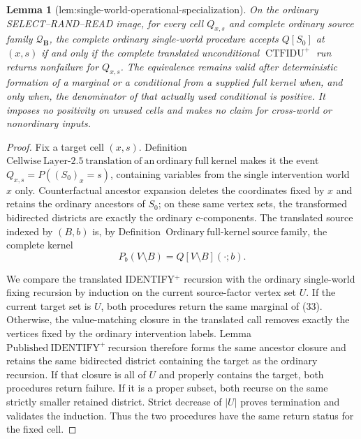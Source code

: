 \documentclass{article}
\newtheorem{lemma}{Lemma}
\begin{document}
\begin{lemma}[lem:single-world-operational-specialization]\label{lem:single-world-operational-specialization}
On the ordinary SELECT--RAND--READ image, for every cell \(Q_{x,s}\) and complete ordinary source family \(\mathcal Q_{\mathbf B}\), the complete ordinary single-world procedure accepts \(Q[S_0]\) at \((x,s)\) if and only if the complete translated unconditional \(\operatorname{CTFIDU}^{+}\) run returns nonfailure for \(Q_{x,s}\).  The equivalence remains valid after deterministic formation of a marginal or a conditional from a supplied full kernel when, and only when, the denominator of that actually used conditional is positive.  It imposes no positivity on unused cells and makes no claim for cross-world or nonordinary inputs.
\end{lemma}
\begin{proof}
Fix a target cell \((x,s)\).  Definition~\(\mathrm{Cellwise\ Layer\mbox{-}2.5\ translation\ of\ an\ ordinary\ full\ kernel}\) makes it the event
\(Q_{x,s}=P((S_0)_x=s)\), containing variables from the single intervention world \(x\) only.  Counterfactual ancestor expansion deletes the coordinates fixed by \(x\) and retains the ordinary ancestors of \(S_0\); on these same vertex sets, the transformed bidirected districts are exactly the ordinary c-components.  The translated source indexed by \((B,b)\) is, by Definition~\(\mathrm{Ordinary\ full\mbox{-}kernel\ source\ family}\), the complete kernel
\[
 P_b(V\setminus B)=Q[V\setminus B](\cdot;b).
 \tag{33}
\]

We compare the translated IDENTIFY\({}^{+}\) recursion with the ordinary single-world fixing recursion by induction on the current source-factor vertex set \(U\).  If the current target set is \(U\), both procedures return the same marginal of (33).  Otherwise, the value-matching closure in the translated call removes exactly the vertices fixed by the ordinary intervention labels.  Lemma~\(\mathrm{Published\ IDENTIFY}^{+}\mathrm{\ recursion}\) therefore forms the same ancestor closure and retains the same bidirected district containing the target as the ordinary recursion.  If that closure is all of \(U\) and properly contains the target, both procedures return failure.  If it is a proper subset, both recurse on the same strictly smaller retained district.  Strict decrease of \(|U|\) proves termination and validates the induction.  Thus the two procedures have the same return status for the fixed cell.


\end{proof}
\end{document}
